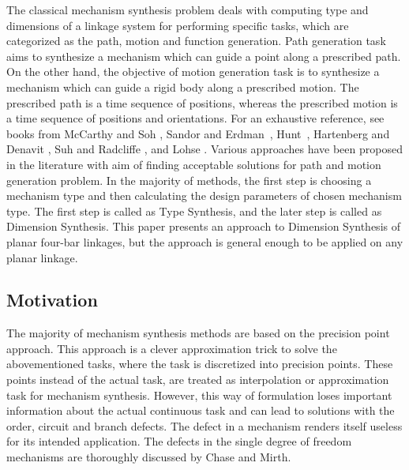 \documentclass[twocolumn,10pt]{asme2ej}
\begin{document}
The classical mechanism synthesis problem deals with computing type and dimensions of a linkage system for performing specific tasks, which are categorized as the path, motion and function generation.
Path generation task aims to synthesize a mechanism which can guide a point along a prescribed path.
On the other hand, the objective of motion generation task is to synthesize a mechanism which can guide a rigid body along a prescribed motion.
The prescribed path is a time sequence of positions, whereas the prescribed motion is a time sequence of positions and orientations.
For an exhaustive reference, see books from McCarthy and Soh \cite{sohmccarthy}, Sandor and Erdman~\cite{Sandor}, Hunt~\cite{Hunt78}, Hartenberg and Denavit \cite{Hartenberg},  Suh and Radcliffe \cite{Suh78}, and Lohse \cite{lohse2013}.
Various approaches have been proposed in the literature with aim of finding acceptable solutions for path and motion generation problem.
In the majority of methods, the first step is choosing a mechanism type and then calculating the design parameters of chosen mechanism type.
The first step is called as Type Synthesis, and the later step is called as Dimension Synthesis.
This paper presents an approach to Dimension Synthesis of planar four-bar linkages, but the approach is general enough to be applied on any planar linkage.

\subsection{Motivation}
The majority of mechanism synthesis methods are based on the precision point approach.
This approach is a clever approximation trick to solve the abovementioned tasks, where the task is discretized into precision points.
These points instead of the actual task, are treated as interpolation or approximation task for mechanism synthesis.
However, this way of formulation loses important information about the actual continuous task and can lead to solutions with the order, circuit and branch defects.
The defect in a mechanism renders itself useless for its intended application.
The defects in the single degree of freedom mechanisms are thoroughly discussed by Chase and Mirth\cite{chasemirth}.
\end{document}
